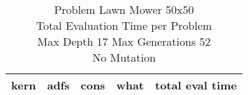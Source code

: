 \begin{table}[H]
\caption{Problem  Lawn Mower 50x50\\Total Evaluation Time per Problem \\ Max Depth 17 Max Generations 52\\ No Mutation \\}
\begin{center}
\scalebox{1.0} %
{
\begin{tabular}{llllr}
\hline
kern & adfs & cons & what & total eval time \\
\hline


\end{tabular}
}
\end{center}
\end{table}


